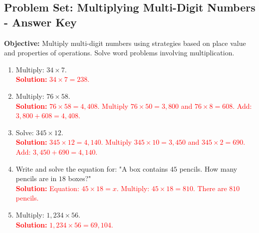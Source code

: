\documentclass[12pt]{article}
\title{}
\date{}
\begin{document}
\subsection*{Problem Set: Multiplying Multi-Digit Numbers - Answer Key}
\onehalfspacing

\begin{tcolorbox}[colframe=black!40, colback=gray!5, 
coltitle=black, colbacktitle=black!20, fonttitle=\bfseries\Large, 
title=Learning Objective, halign title=center, left=5pt, right=5pt, top=5pt, bottom=15pt]
\textbf{Objective:} Multiply multi-digit numbers using strategies based on place value and properties of operations. Solve word problems involving multiplication.
\end{tcolorbox}

\begin{tcolorbox}[colframe=black!60, colback=white, 
coltitle=black, colbacktitle=black!15, fonttitle=\bfseries\Large, 
title=Exercises, halign title=center, left=10pt, right=10pt, top=10pt, bottom=60pt]
\begin{enumerate}[itemsep=2em]
    \item Multiply: \( 34 \times 7 \).\\
    \textcolor{red}{\textbf{Solution:} \(34 \times 7 = 238\).}
    
    \item Multiply: \( 76 \times 58 \).\\
    \textcolor{red}{\textbf{Solution:} \(76 \times 58 = 4,408\). Multiply \(76 \times 50 = 3,800\) and \(76 \times 8 = 608\). Add: \(3,800 + 608 = 4,408\).}

    \item Solve: \( 345 \times 12 \).\\
    \textcolor{red}{\textbf{Solution:} \(345 \times 12 = 4,140\). Multiply \(345 \times 10 = 3,450\) and \(345 \times 2 = 690\). Add: \(3,450 + 690 = 4,140\).}
    
    \item Write and solve the equation for: "A box contains \( 45 \) pencils. How many pencils are in \( 18 \) boxes?"\\
    \textcolor{red}{\textbf{Solution:} Equation: \(45 \times 18 = x\). Multiply: \(45 \times 18 = 810\). There are \(810\) pencils.}
    
    \item Multiply: \( 1,234 \times 56 \).\\
    \textcolor{red}{\textbf{Solution:} \(1,234 \times 56 = 69,104\).}
    

\end{enumerate}
\end{tcolorbox}
\end{document}
